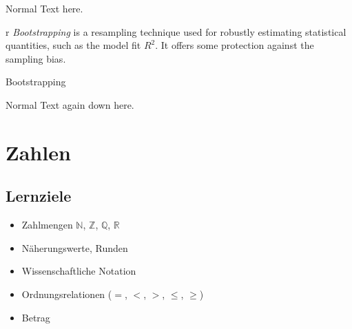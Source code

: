 \documentclass{article}
\begin{document}
Normal Text here.\\

\begin{floatbox}{r}{}
  \textit{Bootstrapping} is a resampling technique used 
  for robustly estimating statistical quantities, such as 
  the model fit $R^2$. It offers some protection against 
  the sampling bias.
  \caption{Bootstrapping}
\end{floatbox}
Normal Text again down here.\\
\section{Zahlen}



\subsection*{Lernziele}

\begin{itemize}
	\item Zahlmengen $\mathbb{N}$, $\mathbb{Z}$, $\mathbb{Q}$, $\mathbb{R}$
  \item Näherungswerte, Runden
  \item Wissenschaftliche Notation
  \item Ordnungsrelationen ($=$, $<$, $>$, $\leq$, $\geq$)
  \item Betrag
\end{itemize}
\end{document}
